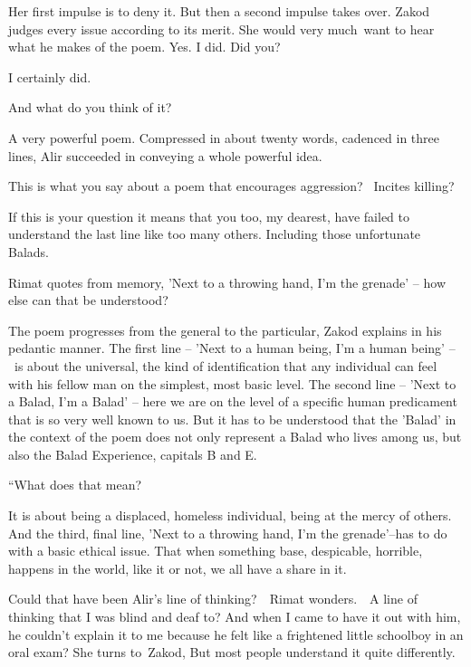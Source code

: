 \documentclass[letterpaper]{article}
\begin{document}
Her first impulse is to deny it. But then a second impulse takes over. Zakod judges every issue according to its merit.
She would very much\ want to hear what he makes of the poem. {\textquotedbl}Yes. I did. Did you?{\textquotedbl}

{\textquotedbl}I certainly did.{\textquotedbl}

{\textquotedbl}And what do you think of it?{\textquotedbl} 

{\textquotedbl}A very powerful poem. Compressed in about twenty words, cadenced in three lines, Alir succeeded in
conveying a whole powerful idea.{\textquotedbl}~ 

{\textquotedbl}This is what you say about a poem that encourages aggression? ~Incites killing?{\textquotedbl} 

{\textquotedbl}If this is your question it means that you too, my dearest, have failed to understand the last line like
too many others. Including those unfortunate Balads.{\textquotedbl} 

Rimat quotes from memory, {\textquotedbl}{}'Next to a throwing hand, I'm the grenade' -- how else can that be
understood?{\textquotedbl} 

{\textquotedbl}The poem progresses from the general to the particular,{\textquotedbl} Zakod explains in his pedantic
manner. {\textquotedbl}The first line -- 'Next to a human being, I'm a human being' --~is about the universal, the kind
of identification that any individual can feel with his fellow man on the simplest, most basic level. The second line
-- 'Next to a Balad, I'm a Balad{}' -- here we are on the level of a specific human predicament that is so very well
known to us. But it has to be understood that the 'Balad{}' in the context of the poem does not only represent a Balad
who lives among us, but also the Balad Experience, capitals B and E.{\textquotedbl}\textcolor{red}{\ }

{}``What does that mean?{\textquotedbl} 

{\textquotedbl}It is about being a displaced, homeless individual, being at the mercy of others. And the third, final
line, 'Next to a throwing hand, I'm the grenade'--has to do with a basic ethical issue. That when something base,
despicable, horrible, happens in the world, like it or not, we all have a share in
it.{\textquotedbl}\textcolor[rgb]{0.0,0.6901961,0.9411765}{\ }

Could that have been Alir's line of thinking?\ \ Rimat wonders.\ \ A line of thinking that I was blind and deaf to? And
when I came to have it out with him, he couldn't explain it to me because he felt like a frightened little schoolboy in
an oral exam? She turns to\textcolor[rgb]{0.0,0.6901961,0.9411765}{\ }Zakod, {\textquotedbl}But most people understand
it quite differently.{\textquotedbl} 
\end{document}
